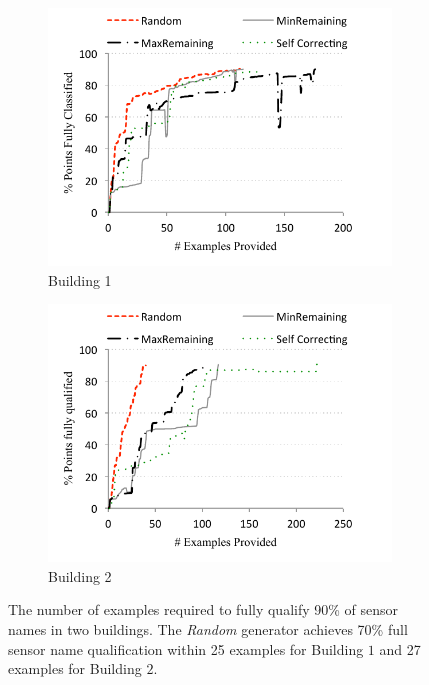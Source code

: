 \begin{figure}[h!]
\centering
	\begin{subfigure}{0.40\textwidth}
                \centering
		\includegraphics[width=\textwidth]{./figs/soda-active-learning.pdf}
                \caption{Building 1}
                \label{fig:active-learning-soda}
	\end{subfigure}
	\begin{subfigure}{0.40\textwidth}
                \centering
		\includegraphics[width=\textwidth]{./figs/sdh-active-learning.pdf}
                \caption{Building 2}
                \label{fig:active-learning-sdh}
	\end{subfigure}
\caption{The number of examples required to fully qualify 90\% of sensor names in two buildings. The {\it Random} generator achieves 70\% full sensor name qualification within 25 examples for Building $1$ and 27 examples for Building $2$.}
\label{fig:active-learning}
\end{figure}


